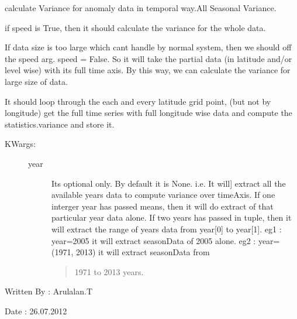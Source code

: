 \documentclass[letterpaper,10pt,english]{sphinxmanual}
\begin{document}
\begin{fulllineitems}
\label{mjo:variance_utils.calculateVariance}
calculate Variance for anomaly data in temporal way.All Seasonal Variance.

if speed is True, then it should calculate the variance for the whole
data.

If data size is too large which cant handle by normal system, then we
should off the speed arg. speed = False. So it will take the partial data
(in latitude and/or level wise) with its full time axis. By this way, we
can calculate the variance for large size of data.

It should loop through the each and every latitude grid point, (but not by
longitude) get the full time series with full longitude wise data and
compute the statistics.variance and store it.
\begin{description}
\item[{KWargs:}] \leavevmode\begin{description}
\item[{year}] \leavevmode{[}Its optional only. By default it is None. i.e. It will{]}
extract all the available years data to compute variance over timeAxis.
If one interger year has passed means, then it will do
extract of that particular year data alone.
If two years has passed in tuple, then it will extract
the range of years data from year{[}0{]} to year{[}1{]}.
eg1 : year=2005 it will extract seasonData of 2005 alone.
eg2 : year=(1971, 2013) it will extract seasonData from
\begin{quote}

1971 to 2013 years.
\end{quote}

\end{description}

\end{description}

Written By : Arulalan.T

Date : 26.07.2012

\end{fulllineitems}

\end{document}
